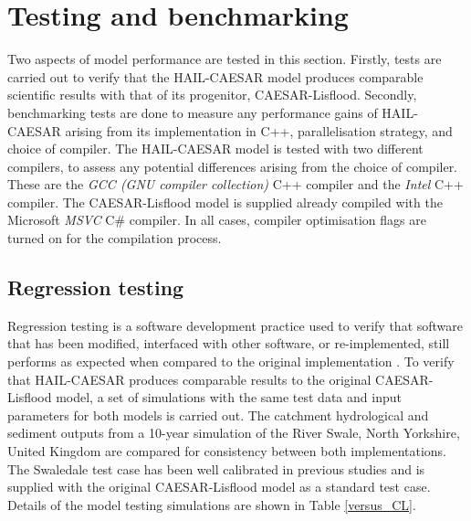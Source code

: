 \section{Testing and benchmarking}

Two aspects of model performance are tested in this section. Firstly, tests are carried out to verify that the HAIL-CAESAR model produces comparable scientific results with that of its progenitor, CAESAR-Lisflood. Secondly, benchmarking tests are done to measure any performance gains of HAIL-CAESAR arising from its implementation in C++, parallelisation strategy, and choice of compiler. The HAIL-CAESAR model is tested with two different compilers, to assess any potential differences arising from the choice of compiler. These are the \textit{GCC (GNU compiler collection)} C++ compiler and the \textit{Intel} C++ compiler. The CAESAR-Lisflood model is supplied already compiled with the Microsoft \textit{MSVC} C\# compiler. In all cases, compiler optimisation flags are turned on for the compilation process.

\subsection{Regression testing}

Regression testing is a software development practice used to verify that software that has been modified, interfaced with other software, or re-implemented, still performs as expected when compared to the original implementation \citep{wong1997study}. To verify that HAIL-CAESAR produces comparable results to the original CAESAR-Lisflood model, a set of simulations with the same test data and input parameters for both models is carried out. The catchment hydrological and sediment outputs from a 10-year simulation of the River Swale, North Yorkshire, United Kingdom are compared for consistency between both implementations. The Swaledale test case has been well calibrated in previous studies \citep[e.g.,][]{Coulthard2001} and is supplied with the original CAESAR-Lisflood model as a standard test case. Details of the model testing simulations are shown in Table \ref{versus_CL}. 

